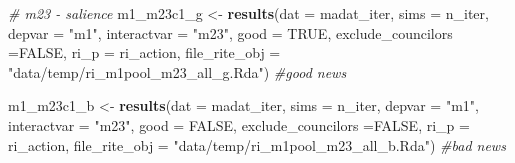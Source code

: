 \documentclass[]{article}
\newenvironment{Shaded}{\begin{snugshade}}{\end{snugshade}}
\newcommand{\KeywordTok}[1]{\textcolor[rgb]{0.13,0.29,0.53}{\textbf{#1}}}
\newcommand{\DataTypeTok}[1]{\textcolor[rgb]{0.13,0.29,0.53}{#1}}
\newcommand{\StringTok}[1]{\textcolor[rgb]{0.31,0.60,0.02}{#1}}
\newcommand{\CommentTok}[1]{\textcolor[rgb]{0.56,0.35,0.01}{\textit{#1}}}
\newcommand{\OtherTok}[1]{\textcolor[rgb]{0.56,0.35,0.01}{#1}}
\newcommand{\NormalTok}[1]{#1}
\begin{document}
\begin{Shaded}
\begin{Highlighting}[]
\CommentTok{# m23 - salience}
\NormalTok{m1_m23c1_g <-}\StringTok{ }\KeywordTok{results}\NormalTok{(}\DataTypeTok{dat =}\NormalTok{ madat_iter, }\DataTypeTok{sims =}\NormalTok{ n_iter, }\DataTypeTok{depvar =} \StringTok{"m1"}\NormalTok{, }\DataTypeTok{interactvar =} \StringTok{"m23"}\NormalTok{, }\DataTypeTok{good =} \OtherTok{TRUE}\NormalTok{, }\DataTypeTok{exclude_councilors =}\OtherTok{FALSE}\NormalTok{,}
                      \DataTypeTok{ri_p =}\NormalTok{ ri_action, }\DataTypeTok{file_rite_obj =} \StringTok{"data/temp/ri_m1pool_m23_all_g.Rda"}\NormalTok{)  }\CommentTok{#good news}

\NormalTok{m1_m23c1_b <-}\StringTok{ }\KeywordTok{results}\NormalTok{(}\DataTypeTok{dat =}\NormalTok{ madat_iter, }\DataTypeTok{sims =}\NormalTok{ n_iter, }\DataTypeTok{depvar =} \StringTok{"m1"}\NormalTok{, }\DataTypeTok{interactvar =} \StringTok{"m23"}\NormalTok{, }\DataTypeTok{good =} \OtherTok{FALSE}\NormalTok{, }\DataTypeTok{exclude_councilors =}\OtherTok{FALSE}\NormalTok{,}
                      \DataTypeTok{ri_p =}\NormalTok{ ri_action, }\DataTypeTok{file_rite_obj =} \StringTok{"data/temp/ri_m1pool_m23_all_b.Rda"}\NormalTok{) }\CommentTok{#bad news}
\end{Highlighting}
\end{Shaded}
\end{document}
